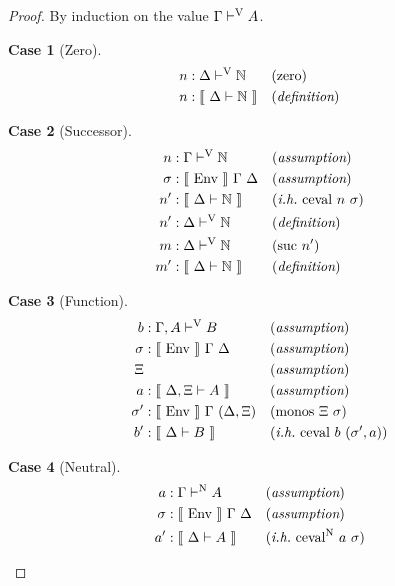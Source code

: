 \documentclass[preprint,nonatbib]{sigplanconf}
\numberwithin{subdefin}{defin}
\theoremstyle{definition}
\numberwithin{subtheorem}{theorem}
\numberwithin{sublemma}{theorem}
\numberwithin{corollary}{theorem}
\numberwithin{case}{theorem}
\numberwithin{slcase}{sublemma}
\newtheorem{scase}{Case}
\numberwithin{scase}{subtheorem}
\numberwithin{lcase}{lemma}
\def\nat{\mathbb{N}}
\def\zero{\con{zero}}
\def\suc{\con{suc}}
\def\monos{\fun{monos}}
\def\cevalv{\fun{ceval}}
\def\cevaln{\fun{ceval}^\con{N}}
\def\bydef{(\textit{definition})}
\def\byass{(\textit{assumption})}
\newcommand{\ih}[1]{(\textit{i.h.}~ #1)}
\newcommand{\by}[1]{(#1)}
\newcommand{\turn}[1]{\vdash^\con{#1}}
\newcommand{\el}[1]{\llbracket ~ #1 ~ \rrbracket}
\newcommand{\con}[1]{\textmd{#1}}
\newcommand{\fun}[1]{\textmd{#1}}
\newcommand{\dtypm}[1]{\el{\Delta \vdash #1}}
\newcommand{\typv}[1]{\Gamma \turn{V} #1}
\newcommand{\dtypv}[1]{\Delta \turn{V} #1}
\newcommand{\gatypv}[1]{\Gamma, A \turn{V} #1}
\newcommand{\typn}[1]{\Gamma \turn{N} #1}
\def\menv{\el{\fun{Env}}~\Gamma~\Delta}
\newcommand{\gmenv}[1]{\el{\fun{Env}}~\Gamma~#1}
\begin{document}
\begin{proof}

By induction on the value $\typv{A}$.

\begin{scase}[Zero]
\begin{align*}
n  &: \dtypv{\nat} && \by{\zero}\\
n  &: \dtypm{\nat} && \bydef
\end{align*}
\end{scase}

\begin{scase}[Successor]
\begin{align*}
n   &: \typv{\nat} && \byass\\
\sigma  &: \menv && \byass\\
n'  &: \dtypm{\nat} && \ih{\cevalv~n~\sigma}\\
n'  &: \dtypv{\nat} && \bydef\\
m   &: \dtypv{\nat} && \by{\suc~n'}\\
m'  &: \dtypm{\nat} && \bydef
\end{align*}
\end{scase}

\begin{scase}[Function]
\begin{align*}
b   &: \gatypv{B} && \byass\\
\sigma  &: \menv && \byass\\
\Xi& && \byass\\
a   &: \el{\Delta, \Xi \vdash A} && \byass\\
\sigma'  &: \gmenv{(\Delta, \Xi)} && \by{\monos~\Xi~\sigma}\\
b'  &: \dtypm{B} && \ih{\cevalv~b~(\sigma', a)}\\
\end{align*}
\end{scase}

\begin{scase}[Neutral]
\begin{align*}
a   &: \typn{A} && \byass\\
\sigma  &: \menv && \byass\\
a'  &: \dtypm{A} && \ih{\cevaln~a~\sigma}
\end{align*}
\end{scase}


\end{proof}
\end{document}
